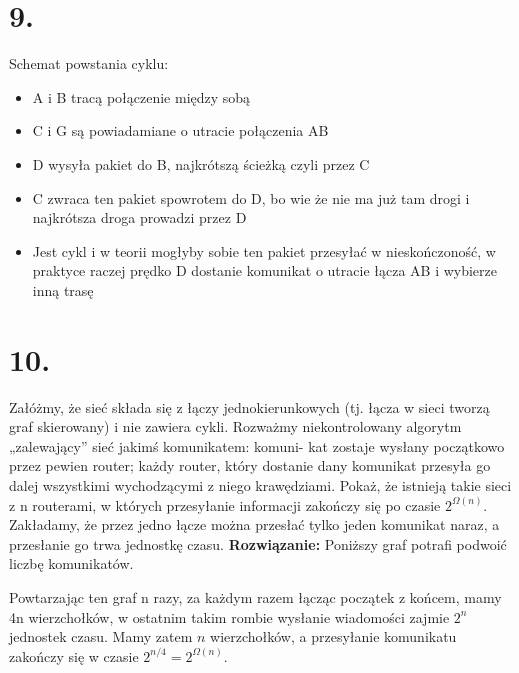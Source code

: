 \documentclass{article}
\begin{document}
\section*{9.}
\newline Schemat powstania cyklu:
\begin{itemize}
    \item A i B tracą połączenie między sobą 
    \item C i G są powiadamiane o utracie połączenia AB
    \item D wysyła pakiet do B, najkrótszą ścieżką czyli przez C
    \item C zwraca ten pakiet spowrotem do D, bo wie że nie ma już tam drogi i najkrótsza droga prowadzi przez D
    \item Jest cykl i w teorii mogłyby sobie ten pakiet przesyłać w nieskończoność, w praktyce raczej prędko D dostanie komunikat o utracie łącza AB i wybierze inną trasę
\end{itemize}

\section*{10.}
Załóżmy, że sieć składa się z łączy jednokierunkowych (tj. łącza w sieci tworzą graf skierowany) i nie zawiera cykli. Rozważmy niekontrolowany algorytm „zalewający” sieć jakimś komunikatem: komuni- kat zostaje wysłany początkowo przez pewien router; każdy router, który dostanie dany komunikat przesyła go dalej wszystkimi wychodzącymi z niego krawędziami. Pokaż, że istnieją takie sieci z n routerami, w których przesyłanie informacji zakończy się po czasie $2^{\Omega(n)}$. Zakładamy, że przez jedno łącze można przesłać tylko jeden komunikat naraz, a przesłanie go trwa jednostkę czasu.
\newline \textbf{Rozwiązanie:} Poniższy graf potrafi podwoić liczbę komunikatów. \newline
{}
\newline
Powtarzając ten graf n razy, za każdym razem łącząc początek z końcem, mamy 4n wierzchołków, w ostatnim takim rombie wysłanie wiadomości zajmie $2^n$ jednostek czasu. Mamy zatem $n$ wierzchołków, a przesyłanie komunikatu zakończy się w czasie $2^{n/4} = 2^{\Omega(n)}$.
\end{document}
